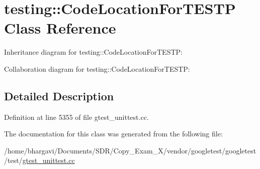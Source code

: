 \hypertarget{classtesting_1_1_code_location_for_t_e_s_t_p}{}\section{testing\+:\+:Code\+Location\+For\+T\+E\+S\+TP Class Reference}
\label{classtesting_1_1_code_location_for_t_e_s_t_p}


Inheritance diagram for testing\+:\+:Code\+Location\+For\+T\+E\+S\+TP\+:


Collaboration diagram for testing\+:\+:Code\+Location\+For\+T\+E\+S\+TP\+:


\subsection{Detailed Description}


Definition at line 5355 of file gtest\+\_\+unittest.\+cc.



The documentation for this class was generated from the following file\+:\begin{DoxyCompactItemize}
\item 
/home/bhargavi/\+Documents/\+S\+D\+R/\+Copy\+\_\+\+Exam\+\_\+X/vendor/googletest/googletest/test/\hyperlink{gtest__unittest_8cc}{gtest\+\_\+unittest.\+cc}\end{DoxyCompactItemize}
